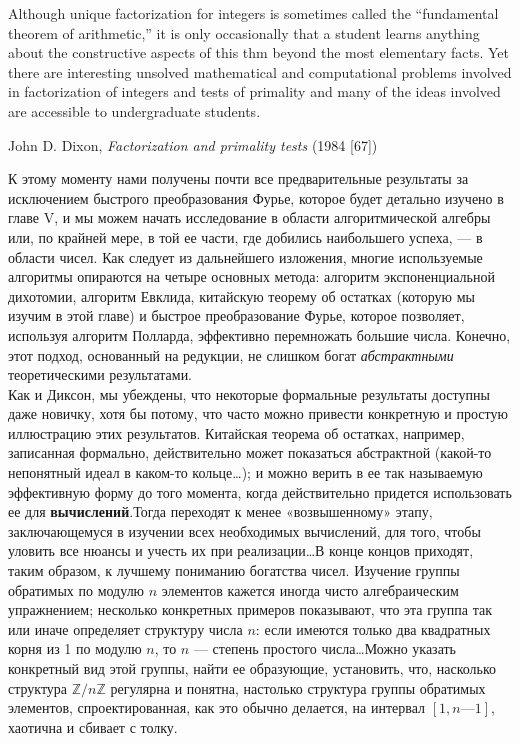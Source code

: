 \documentclass{../../template/mai_book}
\begin{document}
    \epigraph {Although unique factorization for integers is sometimes called the
    “fundamental theorem of arithmetic,” it is only occasionally that a
    student learns anything about the constructive aspects of this
    thm beyond the most elementary facts. Yet there are interesting
    unsolved mathematical and computational problems involved in
    factorization of integers and tests of primality and many of the ideas
    involved are accessible to undergraduate students\footnotemark[1].}{John D. Dixon, \emph{ Factorization and primality tests} (1984 [67])}
    К этому моменту нами получены почти все предварительные результаты за исключением быстрого преобразования Фурье, которое будет детально изучено в главе V, и мы можем начать исследование в области алгоритмической алгебры или, по крайней мере, в той ее
    части, где добились наибольшего успеха, — в области чисел. Как следует из дальнейшего изложения, многие используемые алгоритмы
    опираются на четыре основных метода: алгоритм экспоненциальной дихотомии, алгоритм Евклида, китайскую теорему об остатках (которую мы
    изучим в этой главе) и быстрое преобразование Фурье, которое позволяет, используя алгоритм Полларда, эффективно перемножать большие числа. Конечно,
    этот подход, основанный на редукции, не слишком богат \textit{абстрактными} теоретическими результатами.\\
    \indent Как и Диксон, мы убеждены, что некоторые формальные результаты доступны даже новичку, хотя бы потому, что часто можно привести конкретную и простую иллюстрацию этих результатов. Китайская теорема об остатках, например, записанная формально, действительно может показаться абстрактной (какой-то непонятный идеал в каком-то кольце\ldots); и можно верить в ее так называемую эффективную форму до того момента, когда действительно придется использовать ее для {\textbf{вычислений}}.\linebreak Тогда переходят к менее «возвышенному» этапу, заключающемуся в изучении всех необходимых вычислений, для того, чтобы уловить все нюансы и учесть их при реализации\ldots\;В конце концов приходят, таким образом, к лучшему пониманию богатства чисел. Изучение группы обратимых по модулю $n$ элементов кажется иногда чисто алгебраическим упражнением; несколько конкретных примеров показывают, что эта группа так или иначе определяет структуру числа $n$: если имеются только два квадратных корня из 1 по модулю $n$, то $n$ — степень простого числа\ldots\;Можно указать конкретный вид этой группы, найти ее образующие, установить, что, насколько структура $\mathbb{Z}/n\mathbb{Z}$ регулярна и понятна, настолько структура группы обратимых элементов, спроектированная, как это обычно делается, на интервал $[1, n — 1]$, хаотична и сбивает с толку.\\
\end{document}
